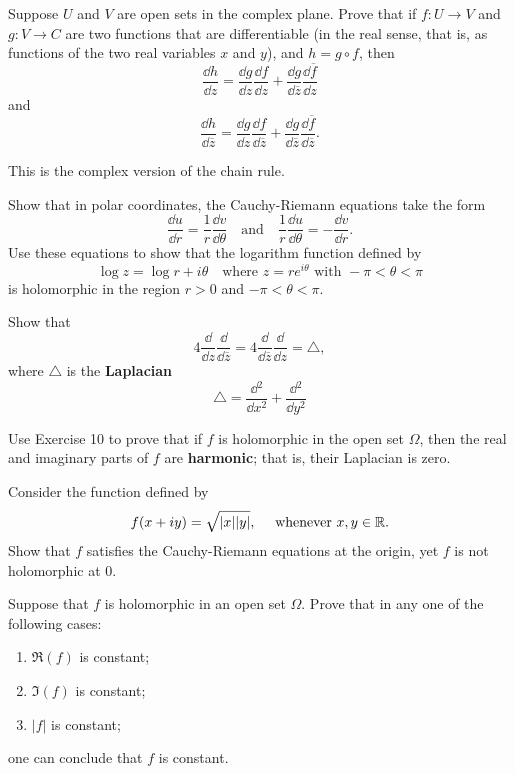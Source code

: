 \begin{exercise}
Suppose $U$ and $V$ are open sets in the complex plane. Prove that if $f : U \to V$ and $g : V \to C$ are two functions that are differentiable (in the real sense, that is, as functions of the two real variables $x$ and $y$), and $h = g \circ f$, then 
$$\frac{\dd{h}}{\dd{z}} = \frac{\dd{g}}{\dd{z}}\frac{\dd{f}}{\dd{z}}+\frac{\dd{g}}{\dd{\overline{z}}}\frac{\dd{\overline{f}}}{\dd{z}}$$ and $$\frac{\dd{h}}{\dd{\overline{z}}} = \frac{\dd{g}}{\dd{z}}\frac{\dd{f}}{\dd{\overline{z}}}+\frac{\dd{g}}{\dd{\overline{z}}}\frac{\dd{\overline{f}}}{\dd{\overline{z}}}.$$ 

This is the complex version of the chain rule.
\end{exercise}

\begin{exercise}
Show that in polar coordinates, the Cauchy-Riemann equations take the form $$\frac{\dd{u}}{\dd{r}}=\frac{1}{r}\frac{\dd{v}}{\dd{\theta}} \quad \text{and} \quad \frac{1}{r}\frac{\dd{u}}{\dd{\theta}} = -\frac{\dd{v}}{\dd{r}}.$$
Use these equations to show that the logarithm function defined by
$$\log z = \log r + i\theta \quad \text{where } z = re^{i\theta} \text{ with } -\pi < \theta < \pi$$ is holomorphic in the region $r > 0$ and $-\pi<\theta<\pi$.
\end{exercise}

\begin{exercise}
Show that $$4\frac{\dd{}}{\dd{z}}\frac{\dd{}}{\dd{\overline{z}}}=4\frac{\dd{}}{\dd{\overline{z}}}\frac{\dd{}}{\dd{z}}=\triangle,$$
where $\triangle$ is the \textbf{Laplacian} $$\triangle = \frac{\dd{}^2}{\dd{x^2}}+\frac{\dd{}^2}{\dd{y^2}}$$
\end{exercise}

\begin{exercise}
Use Exercise 10 to prove that if $f$ is holomorphic in the open set $\Omega$, then the real and imaginary parts of $f$ are \textbf{harmonic}; that is, their Laplacian is zero.
\end{exercise}

\begin{exercise}
Consider the function defined by $$f(x + iy) = \sqrt{|x||y|}, \quad \text{ whenever } x, y \in \mathbb{R}.$$ Show that $f$ satisfies the Cauchy-Riemann equations at the origin, yet $f$ is not
holomorphic at 0.
\end{exercise}

\begin{exercise}
Suppose that $f$ is holomorphic in an open set $\Omega$. Prove that in any one of the following cases:
\begin{enumerate}[label=(\alph*)]
\item $\Re(f)$ is constant;
\item $\Im(f)$ is constant;
\item $|f|$ is constant;
\end{enumerate}
one can conclude that $f$ is constant.
\end{exercise}

